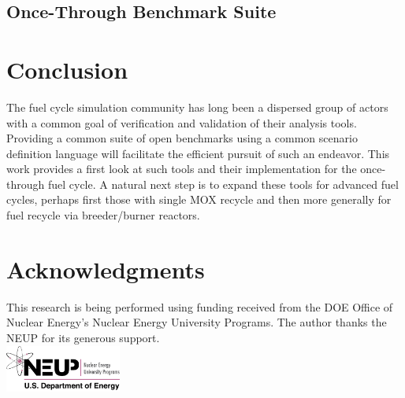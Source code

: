 \documentclass{anstrans}
\begin{document}
\subsection{Once-Through Benchmark Suite}

\section{Conclusion}
The fuel cycle simulation community has long been a dispersed group of actors
with a common goal of verification and validation of their analysis
tools. Providing a common suite of open benchmarks using a common scenario
definition language will facilitate the efficient pursuit of such an
endeavor. This work provides a first look at such tools and their implementation
for the once-through fuel cycle. A natural next step is to expand these tools
for advanced fuel cycles, perhaps first those with single MOX recycle and then
more generally for fuel recycle via breeder/burner reactors.

\section{Acknowledgments}
This research is being performed using funding received from the DOE Office of
Nuclear Energy's Nuclear Energy University Programs.  The author thanks the NEUP
for its generous support.\\ 
\includegraphics[width=1.5in]{neup_logo_large.jpg}


\end{document}
